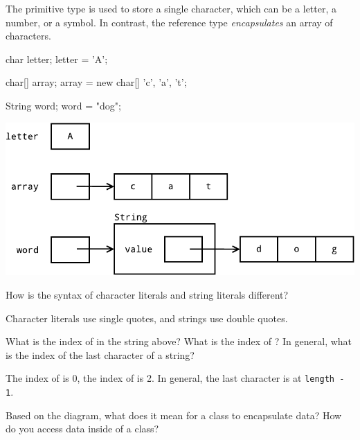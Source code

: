 

The primitive type  is used to store a single character, which can be a letter, a number, or a symbol.
In contrast, the reference type  \emph{encapsulates} an array of characters.

\begin{minipage}[t]{150pt}
\begin{javalst}
char letter;
letter = 'A';

char[] array;
array = new char[]
        {'c', 'a', 't'};

String word;
word = "dog";
\end{javalst}
\end{minipage}
\hfill
\begin{minipage}[t]{345pt}
\null
\includegraphics[width=\linewidth]{string1.pdf}
\null
\end{minipage}




\Q How is the syntax of character literals and string literals different?

\begin{answer}
Character literals use single quotes, and strings use double quotes.
\end{answer}


\Q What is the index of  in the string above?
What is the index of ?
In general, what is the index of the last character of a string?

\begin{answer}
The index of  is 0, the index of  is 2.
In general, the last character is at {\tt length - 1}.
\end{answer}


\Q Based on the diagram, what does it mean for a class to encapsulate data?
How do you access data inside of a class?

